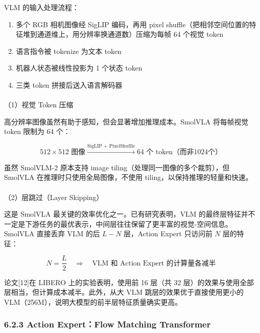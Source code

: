 \documentclass[
  chinese,
]{ctexart}
\makeatletter
\let\oldparagraph\paragraph
\renewcommand{\paragraph}{
    \@ifstar
      \xxxParagraphStar
      \xxxParagraphNoStar
  }
\newcommand{\xxxParagraphStar}[1]{\oldparagraph*{#1}\mbox{}}
\newcommand{\xxxParagraphNoStar}[1]{\oldparagraph{#1}\mbox{}}
\providecommand{\tightlist}{%
  \setlength{\itemsep}{0pt}\setlength{\parskip}{0pt}}
\makeatother
\begin{document}
VLM 的输入处理流程：

\begin{enumerate}
\def\labelenumi{\arabic{enumi}.}
\tightlist
\item
  多个 RGB 相机图像经 SigLIP 编码，再用 pixel
  shuffle（把相邻空间位置的特征堆到通道维上，用分辨率换通道数）压缩为每帧
  64 个视觉 token
\item
  语言指令被 tokenize 为文本 token
\item
  机器人状态被线性投影为 1 个状态 token
\item
  三类 token 拼接后送入语言解码器
\end{enumerate}

\paragraph{（1）视觉 Token 压缩}\label{ux89c6ux89c9-token-ux538bux7f29}

高分辨率图像虽然有助于感知，但会显著增加推理成本。SmolVLA 将每帧视觉
token 限制为 64 个：

\[
512 \times 512 \text{ 图像} \xrightarrow{\text{SigLIP + PixelShuffle}} 64 \text{ 个 token}（而非 1024 个）
\]

虽然 SmolVLM-2 原本支持 image tiling（处理同一图像的多个裁剪），但
SmolVLA 在推理时只使用全局图像，不使用 tiling，以保持推理的轻量和快速。

\paragraph{（2）层跳过（Layer
Skipping）}\label{ux5c42ux8df3ux8fc7layer-skipping}

这是 SmolVLA 最关键的效率优化之一。已有研究表明，VLM
的最终层特征并不一定是下游任务的最优表示，中间层往往保留了更丰富的视觉-空间信息。SmolVLA
直接丢弃 VLM 的后 \(L - N\) 层，Action Expert 只访问前 \(N\) 层的特征：

\[
N = \frac{L}{2} \quad \Longrightarrow \quad \text{VLM 和 Action Expert 的计算量各减半}
\]

论文{[}12{]}在 LIBERO 上的实验表明，使用前 16 层（共 32
层）的效果与使用全部层相当，但计算成本减半。此外，从大 VLM
跳层的效果优于直接使用更小的
VLM（256M），说明大模型的前半层特征质量确实更高。

\subsubsection{6.2.3 Action Expert：Flow Matching
Transformer}\label{action-expertflow-matching-transformer}
\end{document}
